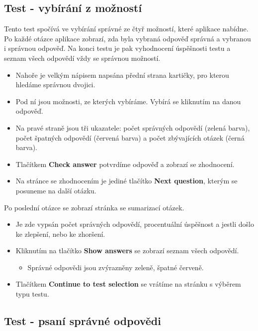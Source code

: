 \documentclass[12pt]{article}
\providecommand{\tightlist}{\setlength{\itemsep}{1pt}\setlength{\parskip}{1pt}}
\begin{document}
\hypertarget{test---vybuxedruxe1nuxed-z-moux17enostuxed}{%
\subsection{Test - vybírání z
možností}\label{test---vybuxedruxe1nuxed-z-moux17enostuxed}}

Tento test spočívá ve vybírání správné ze čtyř možností, které aplikace
nabídne. Po každé otázce aplikace zobrazí, zda byla vybraná odpověď
správná a vybranou i správnou odpověď. Na konci testu je pak vyhodnocení
úspěšnosti testu a seznam všech odpovědí vždy se správnou možností.

\begin{itemize}
\tightlist
\item
  Nahoře je velkým nápisem napsána přední strana kartičky, pro kterou
  hledáme správnou dvojici.
\item
  Pod ní jsou možnosti, ze kterých vybíráme. Vybírá se kliknutím na
  danou odpověď.
\item
  Na pravé straně jsou tři ukazatele: počet správných odpovědí (zelená
  barva), počet špatných odpovědí (červená barva) a počet zbývajících
  otázek (černá barva).
\item
  Tlačítkem \textbf{Check answer} potvrdíme odpověď a zobrazí se
  zhodnocení.
\item
  Na stránce se zhodnocením je jediné tlačítko \textbf{Next question},
  kterým se posuneme na další otázku.
\end{itemize}

Po poslední otázce se zobrazí stránka se sumarizací otázek.

\begin{itemize}
\tightlist
\item
  Je zde vypsán počet správných odpovědí, procentuální úspěšnost a
  jestli došlo ke zlepšení, nebo ke zhoršení.
\item
  Kliknutím na tlačítko \textbf{Show answers} se zobrazí seznam všech
  odpovědí.

  \begin{itemize}
  \tightlist
  \item
    Správné odpovědi jsou zvýrazněny zeleně, špatné červeně.
  \end{itemize}
\item
  Tlačítkem \textbf{Continue to test selection} se vrátíme na stránku s
  výběrem typu testu.
\end{itemize}

\hypertarget{test---psanuxed-spruxe1vnuxe9-odpovux11bdi}{%
\subsection{Test - psaní správné
odpovědi}\label{test---psanuxed-spruxe1vnuxe9-odpovux11bdi}}
\end{document}
